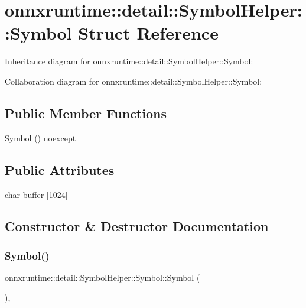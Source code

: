 \hypertarget{structonnxruntime_1_1detail_1_1SymbolHelper_1_1Symbol}{}\section{onnxruntime\+:\+:detail\+:\+:Symbol\+Helper\+:\+:Symbol Struct Reference}
\label{structonnxruntime_1_1detail_1_1SymbolHelper_1_1Symbol}


Inheritance diagram for onnxruntime\+:\+:detail\+:\+:Symbol\+Helper\+:\+:Symbol\+:


Collaboration diagram for onnxruntime\+:\+:detail\+:\+:Symbol\+Helper\+:\+:Symbol\+:
\subsection*{Public Member Functions}
\begin{DoxyCompactItemize}
\item 
\mbox{\hyperlink{structonnxruntime_1_1detail_1_1SymbolHelper_1_1Symbol_a7ed7a94600b70cec7bdeeb8e494fe991}{Symbol}} () noexcept
\end{DoxyCompactItemize}
\subsection*{Public Attributes}
\begin{DoxyCompactItemize}
\item 
char \mbox{\hyperlink{structonnxruntime_1_1detail_1_1SymbolHelper_1_1Symbol_a31dad8fbecab994a90467a591f94e7bd}{buffer}} \mbox{[}1024\mbox{]}
\end{DoxyCompactItemize}


\subsection{Constructor \& Destructor Documentation}
\mbox{\label{structonnxruntime_1_1detail_1_1SymbolHelper_1_1Symbol_a7ed7a94600b70cec7bdeeb8e494fe991}} 
\subsubsection{\texorpdfstring{Symbol()}{Symbol()}}
{\footnotesize\ttfamily onnxruntime\+::detail\+::\+Symbol\+Helper\+::\+Symbol\+::\+Symbol (\begin{DoxyParamCaption}{ }\end{DoxyParamCaption})\hspace{0.3cm}{\ttfamily [inline]}, {\ttfamily [noexcept]}}



